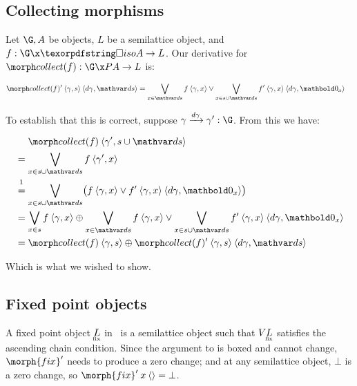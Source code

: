 
\subsection{Collecting morphisms}
\label{sec:CP-collect}

Let $\G, A$ be objects, $L$ be a semilattice object, and $f : \G \x \isof A \to
L$. Our derivative for $\pcollect f : \G \x \pfinof A \to L$ is:

\nopagebreak[2]
\begin{align*}
  \deriv{\pcollect f} \<\tuple{\gamma,s} \<\tuple{\dgamma,\ds}
  &= \bigvee_{x \in \ds} f\<\tuple{\gamma,x} \vee
  \bigvee_{x \in s \cup \ds} \deriv f \<\tuple{\gamma,x} \<\tuple{\dgamma, \zero_x}
\end{align*}

\noindent To establish that this is correct, suppose
$\vld{\dgamma}{\gamma}{\gamma'} : \G$. From this we have:

\nopagebreak[2]
\begin{align*}
  &\phantom{{}={}}\pcollect{f} \<\tuple{\gamma', s \cup \ds}
  \\
  &= \bigvee_{x \in s \cup \ds} f \<\tuple{\gamma', x}
  \\
  &\overset{\footnotemark}{=} \bigvee_{x \in s \cup \ds} \bigl(f \<\tuple{\gamma,x}
  \vee \deriv f \<\tuple{\gamma,x} \<\tuple{\dgamma,\zero_x}\bigr)
  \\
  &= \bigvee_{x \in s} f\<\tuple{\gamma,x}
  \upd \bigvee_{x \in \ds} f\<\tuple{\gamma,x}
  \vee \bigvee_{x \in s \cup \ds} \deriv f \<\tuple{\gamma,x} \<\tuple{\dgamma,\zero_x}
  \\
  &= \pcollect f \<\tuple{\gamma,s}
  \upd \deriv{\pcollect f} \<\tuple{\gamma,s} \<\tuple{\dgamma,\ds}
\end{align*}

\nopagebreak%
\noindent
Which is what we wished to show.


\subsection{Fixed point objects}
\label{sec:CP-fix}

A fixed point object $\fixt L$ in \CP\ is a semilattice object such that
$\vals{\fixt L}$ satisfies the ascending chain condition.  Since the argument to  is boxed and cannot change,
$\deriv{\morph{fix}}$ needs to produce a zero change; and at any semilattice
object, $\bot$ is a zero change, so \( \deriv{\morph{fix}} \<x \<\tuple{} = \bot
\).

